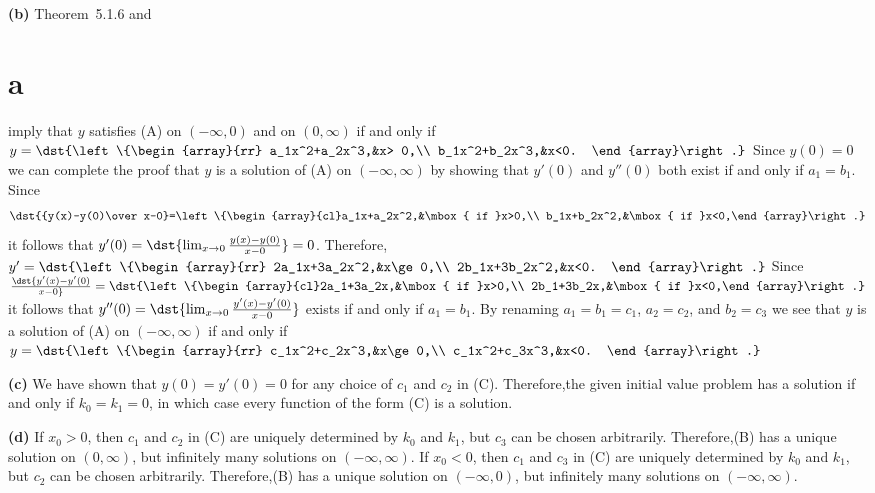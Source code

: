 \documentclass[dvips]{book}
\numberwithin{example}{section}
\numberwithin{equation}{section}
\numberwithin{theorem}{section}
\numberwithin{table}{section}
\numberwithin{figure}{section}
\begin{document}
{\bf (b)} Theorem~5.1.6 and \part{a} imply that $y$
satisfies (A) on $(-\infty,0)$ and on $(0,\infty)$ if and only if
$y=\dst{\left\{\begin{array}{rr}
a_1x^2+a_2x^3,&x> 0,\\
b_1x^2+b_2x^3,&x<0.
\end{array}\right.}$
 Since $y(0)=0$ we can  complete the proof that $y$ is
a solution of
(A) on $(-\infty,\infty)$ by showing
that $y'(0)$ and $y''(0)$ both exist if and only if $a_1=b_1$. Since
$$
\dst{{y(x)-y(0)\over
x-0}=\left\{\begin{array}{cl}a_1x+a_2x^2,&\mbox{
if }x>0,\\ b_1x+b_2x^2,&\mbox{ if }x<0,\end{array}\right.}
$$
 it follows
that $y'(0)=\dst{\lim_{x\to0}{y(x)-y(0)\over x-0}}=0$. Therefore,
$y'=\dst{\left\{\begin{array}{rr}
2a_1x+3a_2x^2,&x\ge 0,\\
2b_1x+3b_2x^2,&x<0.
\end{array}\right.}$
Since
$\dst{y'(x)-y'(0)\over
x-0}=\dst{\left\{\begin{array}{cl}2a_1+3a_2x,&\mbox{
if }x>0,\\ 2b_1+3b_2x,&\mbox{ if }x<0,\end{array}\right.}$ it
follows
that $y''(0)=\dst{\lim_{x\to0}{y'(x)-y'(0)\over x-0}}$ exists
if and only if $a_1=b_1$.  By renaming $a_1=b_1=c_1$, $a_2=c_2$,
and $b_2=c_3$  we see that $y$ is a solution of
(A) on $(-\infty,\infty)$ if and only if
$y=\dst{\left\{\begin{array}{rr}
c_1x^2+c_2x^3,&x\ge 0,\\
c_1x^2+c_3x^3,&x<0.
\end{array}\right.}$

{\bf (c)} We have shown that $y(0)=y'(0)=0$ for any choice
of $c_1$ and $c_2$ in (C). Therefore,the given initial value problem
has a solution if and only if $k_0=k_1=0$, in which case every
function of the form (C) is a solution.

{\bf (d)}  If $x_0>0$, then $c_1$ and $c_2$ in (C) are uniquely
determined by $k_0$ and $k_1$, but $c_3$ can be chosen arbitrarily.
Therefore,(B) has a unique solution on
$(0,\infty)$, but infinitely many solutions on $(-\infty,\infty)$.
  If $x_0<0$, then $c_1$ and $c_3$ in (C) are uniquely
determined by $k_0$ and $k_1$, but $c_2$ can be chosen arbitrarily.
Therefore,(B) has a unique solution on
$(-\infty,0)$, but infinitely many solutions on $(-\infty,\infty)$.
\end{document}
